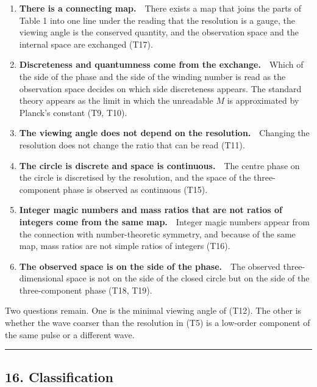 \documentclass[
  a4paper,
]{article}
\providecommand{\tightlist}{%
  \setlength{\itemsep}{0pt}\setlength{\parskip}{0pt}}
\begin{document}
\begin{enumerate}
\def\labelenumi{\arabic{enumi}.}
\tightlist
\item
  \textbf{There is a connecting map.}　There exists a map that joins the
  parts of Table 1 into one line under the reading that the resolution
  is a gauge, the viewing angle is the conserved quantity, and the
  observation space and the internal space are exchanged (T17).
\item
  \textbf{Discreteness and quantumness come from the exchange.}　Which
  of the side of the phase and the side of the winding number is read as
  the observation space decides on which side discreteness appears. The
  standard theory appears as the limit in which the unreadable \(M\) is
  approximated by Planck's constant (T9, T10).
\item
  \textbf{The viewing angle does not depend on the
  resolution.}　Changing the resolution does not change the ratio that
  can be read (T11).
\item
  \textbf{The circle is discrete and space is continuous.}　The centre
  phase on the circle is discretised by the resolution, and the space of
  the three-component phase is observed as continuous (T15).
\item
  \textbf{Integer magic numbers and mass ratios that are not ratios of
  integers come from the same map.}　Integer magic numbers appear from
  the connection with number-theoretic symmetry, and because of the same
  map, mass ratios are not simple ratios of integers (T16).
\item
  \textbf{The observed space is on the side of the phase.}　The observed
  three-dimensional space is not on the side of the closed circle but on
  the side of the three-component phase (T18, T19).
\end{enumerate}

Two questions remain. One is the minimal viewing angle of (T12). The
other is whether the wave coarser than the resolution in (T5) is a
low-order component of the same pulse or a different wave.

\begin{center}\rule{0.5\linewidth}{0.5pt}\end{center}

\subsection{16. Classification}\label{classification}
\end{document}
